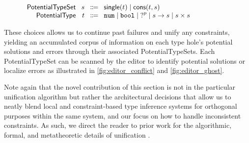 
\begin{figure}[hbt!]
\centering
$\arraycolsep=4pt\begin{array}{rrcl}
\textsf{PotentialTypeSet} & s & \Coloneqq & \textsf{single}(t) \mid \textsf{cons}(t, s) \\
\textsf{PotentialType}    & t & \Coloneqq & \tnum \mid \tbool \mid \tehole^p \mid \tarr{s}{s} \mid \TProd{s}{s}
\end{array}$
\label{fig:syntax_possible_type_sets}
\end{figure}

These choices allows us to continue past failures and unify any constraints, yielding an accumulated corpus of information on each type hole’s potential solutions and errors through their associated \textsf{PotentialTypeSet}s. Each \textsf{PotentialTypeSet} can be scanned by the editor to identify potential solutions or localize errors as illustrated in \cref{fig:editor_conflict} and \cref{fig:editor_ghost}.

Note again that the novel contribution of this section is not in the particular unification algorithm but rather the architectural decisions that allow us to neatly blend local and constraint-based type inference systems for orthogonal purposes within the same system, and our focus on how to handle inconsistent constraints. As such, we direct the reader to prior work for the algorithmic, formal, and metatheoretic details of unification \cite{GradualInfer}.



